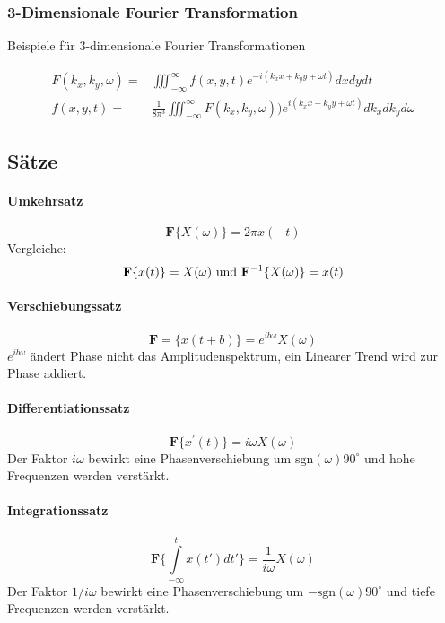 \subsubsection{3-Dimensionale Fourier Transformation}
Beispiele für 3-dimensionale Fourier Transformationen

\begin{align}
F(k_x,k_y,\omega)= & \iiint_{-\infty}^\infty f(x,y,t)e^{-i(k_xx+k_yy+\omega t)} dx dy dt\\
f(x,y,t)= & \frac{1}{8\pi^3} \iiint_{-\infty}^\infty F(k_x,k_y,\omega))e^{i(k_xx+k_yy+\omega t)} dk_x dk_y d\omega
\end{align}

\subsection{Sätze}

\paragraph{Umkehrsatz}
\begin{equation}
\textbf{F} \{X(\omega)\}=2\pi x(-t)
\end{equation}
Vergleiche:
\[
{\bf F} \{x(t)\}=X(\omega) \mbox{ und } {\bf F}^{-1}\{X(\omega)\}=x(t)
\]


\paragraph{Verschiebungssatz}
\begin{equation}
\textbf{F} = \{x(t+b)\}=e^{ib\omega}X(\omega)
\end{equation}
$e^{ib\omega}$ ändert Phase nicht das Amplitudenspektrum, ein Linearer Trend wird zur Phase addiert.


\paragraph{Differentiationssatz}
\begin{equation}
\textbf{F}\{x^\prime(t)\}=i\omega X(\omega)
\end{equation}
Der Faktor $i \omega$ bewirkt eine Phasenverschiebung um $\mbox{sgn}(\omega) 90^\circ$ und hohe Frequenzen werden verstärkt.

\paragraph{Integrationssatz}
\begin{equation}
\textbf{F} \{\int\limits_{-\infty}^{t} x(t')dt'\}=\frac{1}{i\omega} X(\omega)
\end{equation}
Der Faktor $1/i\omega$ bewirkt eine Phasenverschiebung um $-\mbox{sgn}(\omega) 90^\circ$ und tiefe Frequenzen werden verstärkt.

